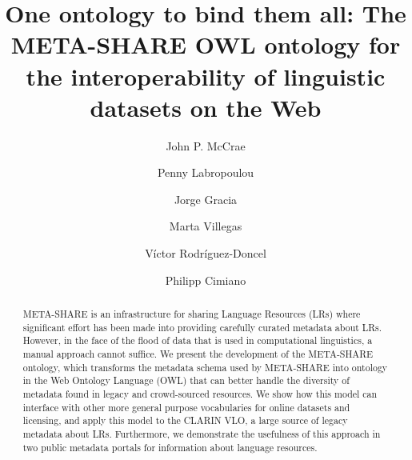 \documentclass{llncs}
\begin{document}
\title{One ontology to bind them all: The META-SHARE OWL ontology for the interoperability of linguistic datasets on the Web}
%
%
\author{John P. McCrae \and Penny Labropoulou \and Jorge
Gracia \and Marta Villegas \and V\'ictor Rodr\'iguez-Doncel \and Philipp Cimiano}
%
%
%
\maketitle %
\begin{abstract}
    META-SHARE is an infrastructure for sharing Language Resources (LRs) where significant effort has been made into
    providing carefully curated metadata about LRs. However, in the face of the flood of data that is used in computational
    linguistics, a manual approach cannot suffice. We present the development of
    the META-SHARE ontology, which transforms the metadata schema used by META-SHARE into ontology in the Web Ontology Language (OWL) that can better handle the diversity of
    metadata found in legacy and crowd-sourced resources. We show how this model can interface with other more general
    purpose vocabularies for online datasets and licensing, and apply this model
    to the CLARIN VLO, a large source of legacy metadata about LRs. Furthermore,
    we demonstrate the usefulness of this approach in two public metadata
    portals for information about language resources.
\end{abstract}
\end{document}
